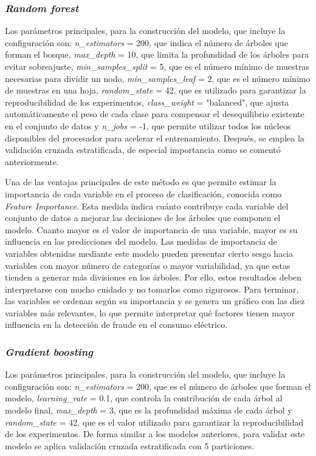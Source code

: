 \documentclass[12pt,a4paper]{report}
\begin{document}
\subsubsection{\emph{Random forest}}

Los parámetros principales, para la construcción del modelo, que incluye la configuración son: \emph{n\_estimators} = 200, que indica el número de árboles que forman el bosque, \emph{max\_depth} = 10, que limita la profundidad de los árboles para evitar sobreajuste, \emph{min\_samples\_split} = 5, que es el número mínimo de muestras necesarias para dividir un nodo, \emph{min\_samples\_leaf} = 2, que es el número mínimo de muestras en una hoja, \emph{random\_state} = 42, que es utilizado para garantizar la reproducibilidad de los experimentos, \emph{class\_weight} = "balanced", que ajusta automáticamente el peso de cada clase para compensar el desequilibrio existente en el conjunto de datos y \emph{n\_jobs} = -1, que permite utilizar todos los núcleos disponibles del procesador para acelerar el entrenamiento. Después, se emplea la validación cruzada estratificada, de especial importancia como se comentó anteriormente.

Una de las ventajas principales de este método es que permite estimar la importancia de cada variable en el proceso de clasificación, conocida como \emph{Feature Importance}. Esta medida indica cuánto contribuye cada variable del conjunto de datos a mejorar las decisiones de los árboles que componen el modelo. Cuanto mayor es el valor de importancia de una variable, mayor es su influencia en las predicciones del modelo. Las medidas de importancia de variables obtenidas mediante este modelo pueden presentar cierto sesgo hacia variables con mayor número de categorías o mayor variabilidad, ya que estas tienden a generar más divisiones en los árboles. Por ello, estos resultados deben interpretarse con mucho cuidado y no tomarlos como rigurosos. Para terminar, las variables se ordenan según su importancia y se genera un gráfico con las diez variables más relevantes, lo que permite interpretar qué factores tienen mayor influencia en la detección de fraude en el consumo eléctrico.


\subsubsection{\emph{Gradient boosting}}

Los parámetros principales, para la construcción del modelo, que incluye la configuración son: \emph{n\_estimators} = 200, que es el número de árboles que forman el modelo, \emph{learning\_rate} = 0.1, que controla la contribución de cada árbol al modelo final, \emph{max\_depth} = 3, que es la profundidad máxima de cada árbol y \emph{random\_state} = 42, que es el valor utilizado para garantizar la reproducibilidad de los experimentos. De forma similar a los modelos anteriores, para validar este modelo se aplica validación cruzada estratificada con 5 particiones.
\end{document}
